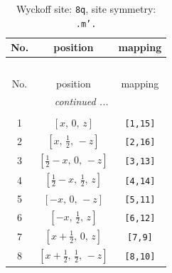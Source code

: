 \documentclass[fleqn,8pt]{jsarticle}
\begin{document}
\begin{longtable}{ccc}
\caption{Wyckoff site: {\tt 8q}, site symmetry: {\tt .m'.}}
 \\
 \hline \hline
No. & position & mapping \\ \hline \endfirsthead

\multicolumn{2}{l}{\tablename\ \thetable{}} \\
 \hline \hline
No. & position & mapping \\ \hline \endhead

 \hline \hline
\multicolumn{2}{r}{\footnotesize\it continued ...} \\ \endfoot

 \hline \hline
\multicolumn{2}{r}{} \\ \endlastfoot

1 & $\left[ x,\, 0,\, z \right]$ & {\tt [1,15]} \\ \hline
2 & $\left[ x,\, \frac{1}{2},\, - z \right]$ & {\tt [2,16]} \\ \hline
3 & $\left[ \frac{1}{2} - x,\, 0,\, - z \right]$ & {\tt [3,13]} \\ \hline
4 & $\left[ \frac{1}{2} - x,\, \frac{1}{2},\, z \right]$ & {\tt [4,14]} \\ \hline
5 & $\left[ - x,\, 0,\, - z \right]$ & {\tt [5,11]} \\ \hline
6 & $\left[ - x,\, \frac{1}{2},\, z \right]$ & {\tt [6,12]} \\ \hline
7 & $\left[ x + \frac{1}{2},\, 0,\, z \right]$ & {\tt [7,9]} \\ \hline
8 & $\left[ x + \frac{1}{2},\, \frac{1}{2},\, - z \right]$ & {\tt [8,10]} \\
\end{longtable}
\renewcommand{\arraystretch}{1.2}
\end{document}
